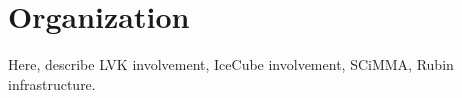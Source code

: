 \section{Organization}\label{sec:organization}

Here, describe LVK involvement, IceCube involvement, SCiMMA, Rubin infrastructure.

\newpage